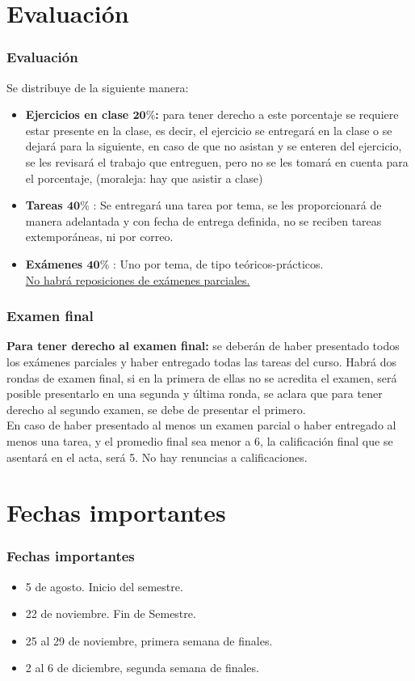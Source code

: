 \documentclass[12pt]{beamer}
\begin{document}
\section{Evaluaci\'{o}n}
\begin{frame}
\frametitle{Evaluaci\'{o}n}
\fontsize{10}{10}\selectfont
Se distribuye de la siguiente manera:
\begin{itemize}
\item \textbf{Ejercicios en clase $\mathbf{20\%}$:} para tener derecho a este porcentaje se requiere estar presente en la clase, es decir, el ejercicio se entregar\'{a} en la clase o se dejar\'{a} para la siguiente, en caso de que no asistan y se enteren del ejercicio, se les revisar\'{a} el trabajo que entreguen, pero no se les tomar\'{a} en cuenta para el porcentaje, (moraleja: hay que asistir a clase) 
\end{itemize}
\end{frame}
\begin{frame}
\fontsize{10}{10}\selectfont
\begin{itemize}
\item \textbf{Tareas $\mathbf{40\%}$} : Se entregar\'{a} una tarea por tema, se les proporcionar\'{a} de manera adelantada y con fecha de entrega definida, no se reciben tareas extempor\'{a}neas, ni por correo.
\item \textbf{Ex\'{a}menes $\mathbf{40\%}$} : Uno por tema, de tipo teóricos-pr\'{a}cticos. 
\\
\bigskip
\underline{No habr\'{a} reposiciones de ex\'{a}menes parciales.}
\end{itemize}
\end{frame}
\begin{frame}
\frametitle{Examen final}
\fontsize{12}{12}\selectfont
\textbf{Para tener derecho al examen final:} se deber\'{a}n de haber presentado todos los ex\'{a}menes parciales y haber entregado todas las tareas del curso. Habr\'{a} dos rondas de examen final, si en la primera de ellas no se acredita el examen, ser\'{a} posible presentarlo en una segunda y \'{u}ltima ronda, se aclara que para tener derecho al segundo examen, se debe de presentar el primero.
\\
\bigskip
En caso de haber presentado al menos un examen parcial o haber entregado al menos una tarea, y el promedio final sea menor a 6, la calificación final que se asentar\'{a} en el acta, ser\'{a} 5. No hay renuncias a calificaciones.
\end{frame}
\section{Fechas importantes}
\begin{frame}
\frametitle{Fechas importantes}
\begin{itemize}
\item 5 de agosto. Inicio del semestre.
\item 22 de noviembre. Fin de Semestre.
\item 25 al 29 de noviembre, primera semana de finales.
\item 2 al 6 de diciembre, segunda semana de finales.
\end{itemize}
\end{frame}
\end{document}
